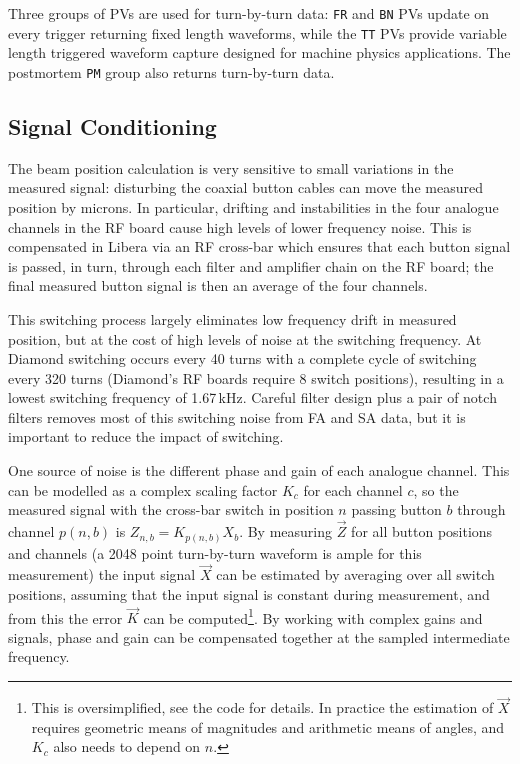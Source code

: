 \documentclass{JAC2003}
\begin{document}
Three groups of PVs are used for turn-by-turn data: \texttt{FR} and
\texttt{BN} PVs update on every trigger returning fixed length waveforms,
while the \texttt{TT} PVs provide variable length triggered waveform capture 
designed for machine physics applications.  The postmortem \texttt{PM} group
also returns turn-by-turn data.


\subsection{Signal Conditioning}

The beam position calculation is very sensitive to small variations in the
measured signal: disturbing the coaxial button cables can move the measured
position by microns.  In particular, drifting and instabilities in the four
analogue channels in the RF board cause high levels of lower frequency noise.
This is compensated in Libera via an RF cross-bar which ensures that each
button signal is passed, in turn, through each filter and amplifier chain on
the RF board; the final measured button signal is then an average of the four
channels.

This switching process largely eliminates low frequency drift in measured
position, but at the cost of high levels of noise at the switching frequency.
At Diamond switching occurs every 40 turns with a complete cycle of switching
every 320 turns (Diamond's RF boards require 8 switch positions), resulting in
a lowest switching frequency of 1.67\,kHz.  Careful filter design plus a pair
of notch filters removes most of this switching noise from FA and SA data, but
it is important to reduce the impact of switching.

One source of noise is the different phase and gain of each analogue channel.
This can be modelled as a complex scaling factor $K_c$ for each channel $c$,
so the measured signal with the cross-bar switch in position $n$ passing
button $b$ through channel $p(n,b)$ is $Z_{n,b} = K_{p(n,b)} X_b$.  By
measuring $\vec{Z}$ for all button positions and channels (a 2048 point
turn-by-turn waveform is ample for this measurement) the input signal
$\vec{X}$ can be estimated by averaging over all switch positions, assuming
that the input signal is constant during measurement, and from this the error
$\vec{K}$ can be computed\footnote{%
%
    This is oversimplified, see the code\cite{libera-epics-web} for details.
    In practice the estimation of $\vec{X}$ requires geometric means of
    magnitudes and arithmetic means of angles, and $K_c$ also needs to depend
    on $n$.
%
}.  By working with complex gains and signals, phase and gain can be
compensated together at the sampled intermediate frequency.
\end{document}
